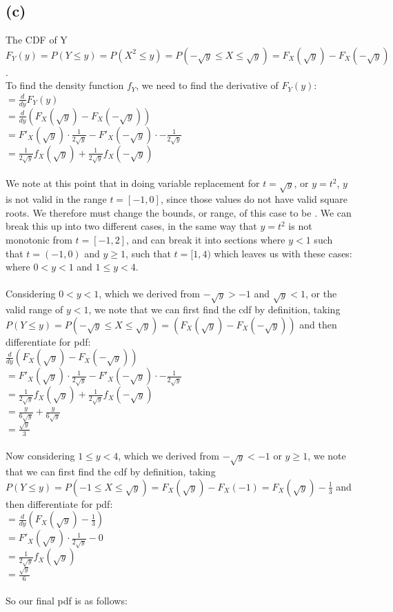 \documentclass{article}
\begin{document}
{\subsection*{(c)}
The CDF of Y $F_Y(y) = P(Y \leq y) = P(X^2 \leq y) = P(-\sqrt{y} \leq X \leq \sqrt{y}) = F_X(\sqrt{y}) - F_X(-\sqrt{y})$. \\
To find the density function $f_Y$, we need to find the derivative of $F_Y(y)$: \\
$= \frac{d}{dy}F_Y(y)$ \\ 
$= \frac{d}{dy}(F_X(\sqrt{y}) - F_X(-\sqrt{y})) $ \\ 
$= {F'}_X(\sqrt{y}) \cdot \frac{1}{2\sqrt{y}} - {F'}_X(-\sqrt{y}) \cdot -\frac{1}{2\sqrt{y}}$ \\
$ = \frac{1}{2\sqrt{y}}f_X(\sqrt{y}) + \frac{1}{2\sqrt{y}}f_X(-\sqrt{y})$ \\ \\
We note at this point that in doing variable replacement for $t = \sqrt{y}$, or $y = t^2$, $y$ is not valid in the range $t = [-1, 0]$, since those values do not have valid square roots. We therefore must change the bounds, or range, of this case to be . We can break this up into two different cases, in the same way that $y = t^2$ is not monotonic from $t = [-1,2]$, and can break it into sections where $y < 1$ such that $t = (-1, 0)$ and $y \geq 1$, such that $t = [1, 4)$ which leaves us with these cases: where $0 < y < 1$ and $1 \leq y < 4$. \\ \\ Considering $0 < y < 1$, which we derived from $-\sqrt{y} > -1$ and $\sqrt{y} < 1$, or the valid range of $y < 1$, we note that we can first find the cdf by definition, taking $P(Y \leq y) = P(-\sqrt{y} \leq X \leq \sqrt{y}) = (F_X(\sqrt{y}) - F_X(-\sqrt{y}))$ and then differentiate for pdf: \\
$\frac{d}{dy}(F_X(\sqrt{y}) - F_X(-\sqrt{y})) $ \\  
$= {F'}_X(\sqrt{y}) \cdot \frac{1}{2\sqrt{y}} - {F'}_X(-\sqrt{y}) \cdot -\frac{1}{2\sqrt{y}}$ \\
$ = \frac{1}{2\sqrt{y}}f_X(\sqrt{y}) + \frac{1}{2\sqrt{y}}f_X(-\sqrt{y})$ \\ 
$= \frac{y}{6\sqrt{y}} + \frac{y}{6\sqrt{y}}$ \\ 
$= \frac{\sqrt{y}}{3}$ \\ 
\\ Now considering $1 \leq y < 4$, which we derived from $-\sqrt{y} < -1$ or $y \geq 1$, we note that we can first find the cdf by definition, taking $P(Y \leq y) = P(-1 \leq X \leq \sqrt{y}) = F_X(\sqrt{y}) - F_X(-1) = F_X(\sqrt{y}) - \frac{1}{3} $ and then differentiate for pdf: \\
$= \frac{d}{dy}(F_X(\sqrt{y}) - \frac{1}{3}) $ \\ 
$= {F'}_X(\sqrt{y}) \cdot \frac{1}{2\sqrt{y}} - 0$ \\
$= \frac{1}{2\sqrt{y}}f_X(\sqrt{y})$ \\ 
$= \frac{\sqrt{y}}{6}$ \\ \\
So our final pdf is as follows:

}
\end{document}
